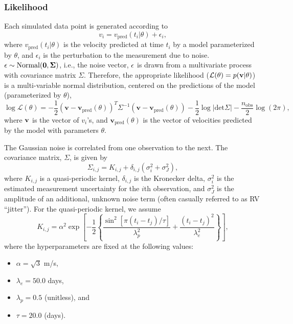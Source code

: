 \documentclass{article}
\begin{document}
\subsubsection{Likelihood}
Each simulated data point is generated according to
%
\begin{equation}
v_i = v_{\mathrm{pred}}(t_i|\theta) + \epsilon_i,
\end{equation}
%
where $v_{\mathrm{pred}}(t_i|\theta)$ is the velocity predicted at time $t_i$ by a model parameterized by $\theta$, and $\epsilon_i$ is the perturbation to the measurement due to noise.  
$\bf{\epsilon} \sim \mathrm{Normal}(0,\Sigma)$, i.e., the noise vector, $\bf{\epsilon}$ is drawn from a multivariate process with covariance matrix $\Sigma$.  
Therefore, the appropriate likelihood ($\mathcal{L}(\theta) = p(\bf{v} | \theta )$) is a multi-variable normal distribution, centered on the predictions of the model (parameterized by $\theta$),
%
\begin{equation}
\log \mathcal{L}(\theta) =  
-\frac{1}{2} (\mathbf{v}-\mathbf{v}_{\mathrm{pred}}(\theta))^{T} \Sigma^{-1} (\mathbf{v}-\mathbf{v}_{\mathrm{pred}}(\theta)) 
-\frac{1}{2} \log \left| \mathrm{det} \Sigma \right| 
-\frac{n_{\mathrm{obs}}}{2} \log (2\pi),
\end{equation}
%
where $\bf{v}$ is the vector of $v_i$'s, and $\mathbf{v}_{\mathrm{pred}}(\theta)$ is the vector of velocities predicted by the model with parameters $\theta$.

The Gaussian noise is correlated from one observation to the next.  
The covariance matrix, $\Sigma$, is given by 
\begin{equation}
\Sigma_{i,j} = K_{i,j} + \delta_{i,j} \left(\sigma_i^2 + \sigma_{J}^2 \right),
\end{equation}
where $K_{i,j}$ is a quasi-periodic kernel, $\delta_{i,j}$ is the Kronecker delta,
$\sigma_i^2$ is the estimated measurement uncertainty for the $i$th observation, and
$\sigma_{J}^2$ is the amplitude of an additional, unknown noise term (often casually referred to as RV ``jitter'').  
For the quasi-periodic kernel, we assume
\begin{equation}
K_{i,j} = \alpha^2 \exp\left[-\frac{1}{2}\left\{ \frac{\sin^2[\pi(t_i-t_j)/\tau]}{\lambda_p^2} + \frac{(t_i-t_j)^2}{\lambda_e^2}\right\}\right], 
\end{equation}
%
where the hyperparameters are fixed at the following values:
\begin{itemize}
\item $\alpha = \sqrt{3}$ m/s,
\item $\lambda_e = 50.0$ days,
\item $\lambda_p = 0.5$ (unitless), and
\item $\tau = 20.0$ (days).
\end{itemize}
\end{document}
